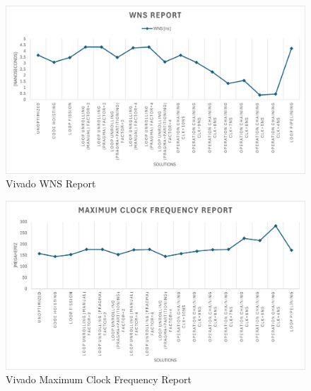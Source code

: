 \begin{figure}[H]
	\centering
	\includegraphics[width=0.7\textheight]{conclusions/wns.png}
	\caption{Vivado WNS Report}
	\label{fig:vivado-wns-report}
\end{figure}

\begin{figure}[H]
	\centering
	\includegraphics[width=0.7\textheight]{conclusions/frequency.png}
	\caption{Vivado Maximum Clock Frequency Report}
	\label{fig:vivado-maximum-clock-frequency-report}
\end{figure}